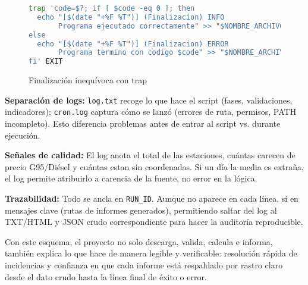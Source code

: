 \begin{figure}[H]
  \footnotesize
  \begin{lstlisting}[language=bash]
trap 'code=$?; if [ $code -eq 0 ]; then
  echo "[$(date "+%F %T")] (Finalizacion) INFO 
       Programa ejecutado correctamente" >> "$NOMBRE_ARCHIVO_LOG"
else
  echo "[$(date "+%F %T")] (Finalizacion) ERROR 
       Programa termino con codigo $code" >> "$NOMBRE_ARCHIVO_LOG"
fi' EXIT
\end{lstlisting}
  \caption{Finalización inequívoca con trap}
\end{figure}

\textbf{Separación de logs:} \texttt{log.txt} recoge lo que hace el script (fases, validaciones, indicadores); \texttt{cron.log} captura cómo se lanzó (errores de ruta, permisos, PATH incompleto). Esto diferencia problemas antes de entrar al script vs. durante ejecución.

\textbf{Señales de calidad:} El log anota el total de las estaciones, cuántas carecen de precio G95/Diésel y cuántas estan sin coordenadas. Si un día la media es extraña, el log permite atribuirlo a carencia de la fuente, no error en la lógica.

\textbf{Trazabilidad:} Todo se ancla en \texttt{RUN\_ID}. Aunque no aparece en cada línea, sí en mensajes clave (rutas de informes generados), permitiendo saltar del log al TXT/HTML y JSON crudo correspondiente para hacer la auditoría reproducible.

Con este esquema, el proyecto no solo descarga, valida, calcula e informa, también explica lo que hace de manera legible y verificable: resolución rápida de incidencias y confianza en que cada informe está respaldado por rastro claro desde el dato crudo hasta la línea final de éxito o error.

